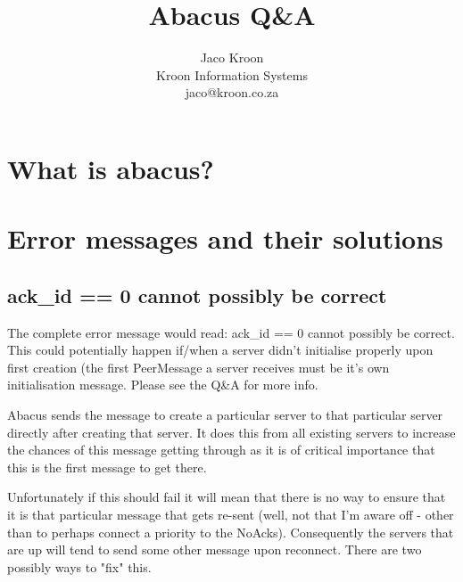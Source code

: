 \documentclass[12pt,a4paper]{article}
\title{Abacus Q\&A}
\author{Jaco Kroon\\Kroon Information Systems\\jaco@kroon.co.za}
\date{}
\begin{document}
\pagestyle{empty}
\maketitle


\newpage
\pagestyle{plain}
\tableofcontents


\newpage
{}
\setcounter{page}{1}

\section{What is abacus?}

\section{Error messages and their solutions}
\subsection{ack\_id == 0 cannot possibly be correct}
The complete error message would read:  ack\_id == 0 cannot possibly be correct.  This could potentially happen if/when a server didn't initialise properly upon first creation (the first PeerMessage a server receives must be it's own initialisation message.  Please see the Q\&A for more info.

Abacus sends the message to create a particular server to that particular server directly after creating that server.  It does this from all existing servers to increase the chances of this message getting through as it is of critical importance that this is the first message to get there.

Unfortunately if this should fail it will mean that there is no way to ensure that it is that particular message that gets re-sent (well, not that I'm aware off - other than to perhaps connect a priority to the NoAcks).  Consequently the servers that are up will tend to send some other message upon reconnect.  There are two possibly ways to "fix" this.
\end{document}
